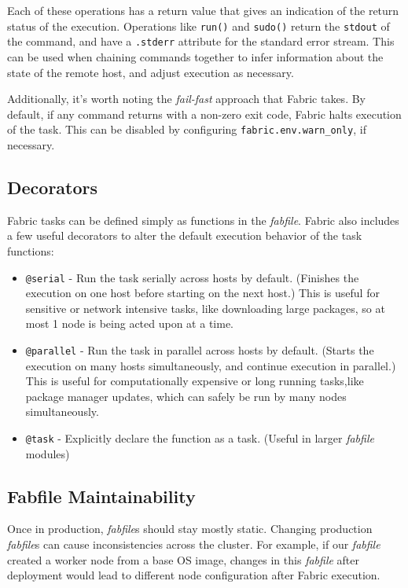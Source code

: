 \documentclass[9pt,twocolumn,twoside]{idsi}
\begin{document}
Each of these operations has a return value that gives an indication of the return status of the execution. Operations like \texttt{run()} and \texttt{sudo()} return the \texttt{stdout} of the command, and have a \texttt{.stderr} attribute for the standard error stream. This can be used when chaining commands together to infer information about the state of the remote host, and adjust execution as necessary.

Additionally, it's worth noting the \emph{fail-fast} approach that Fabric takes. By default, if any command returns with a non-zero exit code, Fabric halts execution of the task. This can be disabled by configuring \texttt{fabric.env.warn\_only}, if necessary.

\subsection{Decorators}
Fabric tasks can be defined simply as functions in the \emph{fabfile}. Fabric also includes a few useful decorators to alter the default execution behavior of the task functions:
\begin{itemize}
  \item \texttt{@serial} - Run the task serially across hosts by default. (Finishes the execution on one host before starting on the next host.) This is useful for sensitive or network intensive tasks, like downloading large packages, so at most 1 node is being acted upon at a time.
  \item \texttt{@parallel} - Run the task in parallel across hosts by default. (Starts the execution on many hosts simultaneously, and continue execution in parallel.) This is useful for computationally expensive or long running tasks,like package manager updates, which can safely be run by many nodes simultaneously.
  \item \texttt{@task} - Explicitly declare the function as a task. (Useful in larger \emph{fabfile} modules)
\end{itemize}

\subsection{Fabfile Maintainability}
Once in production, \emph{fabfile}s should stay mostly static. Changing production \emph{fabfile}s can cause inconsistencies across the cluster. For example, if our \emph{fabfile} created a worker node from a base OS image, changes in this \emph{fabfile} after deployment would lead to different node configuration after Fabric execution.
\end{document}
